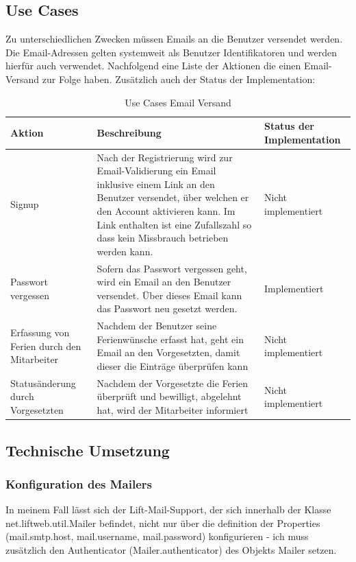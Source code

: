 \subsection{Use Cases}
Zu unterschiedlichen Zwecken m\"ussen  Emails an die Benutzer versendet werden. Die Email-Adressen gelten systemweit als Benutzer Identifikatoren und werden hierf\"ur auch verwendet. Nachfolgend eine Liste der Aktionen die einen Email-Versand zur Folge haben. Zus\"atzlich auch der Status der Implementation:
  \begin{longtable}{|p{3cm}|p{7cm}|p{3cm}|}
      \caption{Use Cases Email Versand}\\
\hline
  \textbf{Aktion} & \textbf{Beschreibung} & \textbf{Status der Implementation}\\
  \hline
  Signup&Nach der Registrierung wird zur Email-Validierung ein Email inklusive einem Link an den Benutzer versendet, \"uber welchen er den Account aktivieren kann. Im Link enthalten ist eine Zufallszahl so dass kein Missbrauch betrieben werden kann. & Nicht implementiert\\
  \hline
  Passwort vergessen&Sofern das Passwort vergessen geht, wird ein Email an den Benutzer versendet. \"Uber dieses Email kann das Passwort neu gesetzt werden. & Implementiert\\
  \hline
  Erfassung von Ferien durch den Mitarbeiter & Nachdem der Benutzer seine Ferienw\"unsche erfasst hat, geht ein Email an den Vorgesetzten, damit dieser die Eintr\"age \"uberpr\"ufen kann & Nicht implementiert \\
  \hline
  Status\"anderung durch Vorgesetzten & Nachdem der Vorgesetzte die Ferien \"uberpr\"uft und bewilligt, abgelehnt hat, wird der Mitarbeiter informiert & Nicht implementiert\\
  \hline
\end{longtable}
 
 \subsection{Technische Umsetzung}
 \subsubsection{Konfiguration des Mailers}
 In meinem Fall l\"asst sich der Lift-Mail-Support, der sich innerhalb der Klasse net.liftweb.util.Mailer befindet, nicht nur \"uber die definition der Properties (mail.smtp.host, mail.username, mail.password) konfigurieren - ich muss zus\"atzlich den Authenticator (Mailer.authenticator) des Objekts Mailer setzen.

